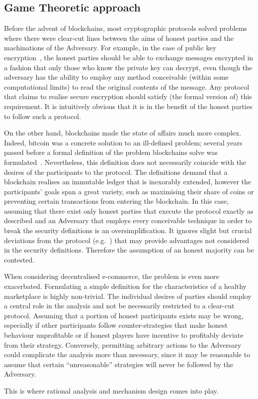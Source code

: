 \subsection{Game Theoretic approach}
  Before the advent of blockchains, most cryptographic protocols solved problems where
  there were clear-cut lines between the aims of honest parties and the machinations of
  the Adversary. For example, in the case of public key encryption~\cite{dh}, the honest
  parties should be able to exchange messages encrypted in a fashion that only those who
  know the private key can decrypt, even though the adversary has the ability to employ
  any method conceivable (within some computational limits) to read the original contents
  of the message. Any protocol that claims to realise secure encryption should satisfy
  (the formal version of) this requirement. It is intuitively obvious that it is in the
  benefit of the honest parties to follow such a protocol.

  On the other hand, blockchains made the state of affairs much more complex. Indeed,
  bitcoin was a concrete solution to an ill-defined problem; several years passed before a
  formal definition of the problem blockchains solve was formulated~\cite{backbone}.
  Nevertheless, this definition does not necessarily coincide with the desires of the
  participants to the protocol. The definitions demand that a blockchain realises an
  immutable ledger that is inexorably extended, however the participants' goals span a
  great variety, such as maximising their share of coins or preventing certain
  transactions from entering the blockchain. In this case, assuming that there exist only
  honest parties that execute the protocol exactly as described and an Adversary that
  employs every conceivable technique in order to break the security definitions is an
  oversimplification. It ignores slight but crucial deviations from the protocol
  (e.g.~\cite{selfishmine}) that may provide advantages not considered in the security
  definitions. Therefore the assumption of an honest majority can be contested.

  When considering decentralised e-commerce, the problem is even more exacerbated.
  Formulating a simple definition for the characteristics of a healthy marketplace is
  highly non-trivial. The individual desires of parties should employ a central role in
  the analysis and not be necessarily restricted to a clear-cut protocol. Assuming that a
  portion of honest participants exists may be wrong, especially if other participants
  follow counter-strategies that make honest behaviour unprofitable or if honest players
  have incentive to profitably deviate from their strategy. Conversely, permitting
  arbitrary actions to the Adversary could complicate the analysis more than necessary,
  since it may be reasonable to assume that certain ``unreasonable'' strategies will never
  be followed by the Adversary.

  This is where rational analysis and mechanism design comes into play.
